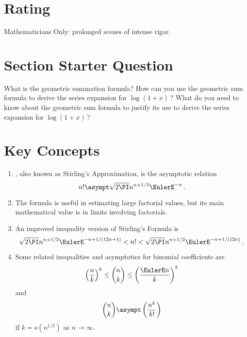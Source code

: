 \documentclass[12pt]{article}
\begin{document}
\myheader \mytitle

\hr


\hr

\usefirefox

\hr

\section*{Rating} %
Mathematicians Only:  prolonged scenes of intense rigor.

\hr

\section*{Section Starter Question} What is the geometric summation
formula?  How can you use the geometric sum formula to derive the series
expansion for \( \log( 1 + x) \)\,?  What do you need to know about the
geometric sum formula to justify its use to derive the series expansion
for \( \log( 1 + x) \)\,?

\hr

\section*{Key Concepts}

\begin{enumerate}
    \item
        , also known as Stirling's Approximation,
        is the asymptotic relation
        \[
            n!  \asympt \sqrt{2 \PI} n^{n+1/2} \EulerE^{-n}\,.
        \]
    \item
        The formula is useful in estimating large factorial values, but
        its main mathematical value is in limits involving factorials.
    \item
        An improved inequality version of Stirling's Formula is
        \[
            \sqrt{2 \PI} n^{n+1/2} \EulerE^{-n + 1/(12n+1)} < n!  <
            \sqrt{2 \PI} n^{n+1/2} \EulerE^{-n + 1/(12n)}\,.
        \]
    \item
        Some related inequalities and asymptotics for binomial
        coefficients are
        \[
            \left( \frac{n}{k} \right)^k \le \binom{n}{k} \le \left(
            \frac{\EulerE n}{k} \right)^k
        \] and
        \[
            \binom{n}{k} \asympt \left(\frac{n^k}{k!} \right)
        \] if \( k = o(n^{1/2}) \) as \( n \to \infty \).
\end{enumerate}
\end{document}
